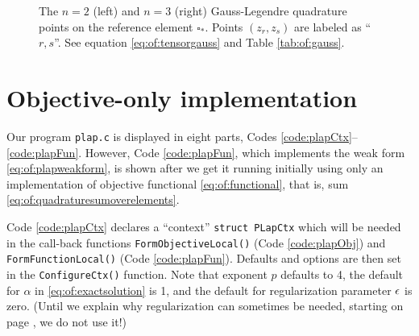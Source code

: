 \newcommand{\gausssanspts}{
  \draw[->,very thin] (-1.2,0.0) -- (1.2,0.0) node[below] {\small $\xi$};
  \draw[->,very thin] (0.0,-1.2) -- (0.0,1.2) node[left] {\small $\eta$};
  \draw[line width=1.5pt] (1.0,1.0) -- (-1.0,1.0) -- (-1.0,-1.0) -- (1.0,-1.0) -- cycle;
}

\begin{figure}
\qquad\qquad
{}
\caption{The $n=2$ (left) and $n=3$ (right) Gauss-Legendre quadrature points on the reference element $\square_\ast$.  Points $(z_r,z_s)$ are labeled as ``$r,s$''.  See equation \eqref{eq:of:tensorgauss} and Table \ref{tab:of:gauss}.}
\label{fig:of:gausstwod}
\end{figure}


\section{Objective-only implementation}

Our program \texttt{plap.c} is displayed in eight parts, Codes \ref{code:plapCtx}--\ref{code:plapFun}.  However, Code \ref{code:plapFun}, which implements the weak form \eqref{eq:of:plapweakform}, is shown after we get it running initially using only an implementation of objective functional \eqref{eq:of:functional}, that is, sum \eqref{eq:of:quadraturesumoverelements}.


Code \ref{code:plapCtx} declares a ``context'' \texttt{struct PLapCtx} which will be needed in the call-back functions \texttt{FormObjectiveLocal()} (Code \ref{code:plapObj}) and \texttt{FormFunctionLocal()} (Code \ref{code:plapFun}).  Defaults and \PETSc options are then set in the \texttt{ConfigureCtx()} function.  Note that exponent $p$ defaults to 4, the default for $\alpha$ in \eqref{eq:of:exactsolution} is 1, and the default for regularization parameter $\epsilon$ is zero.  (Until we explain why regularization can sometimes be needed, starting on page \pageref{page:of:regularization}, we do not use it!)

